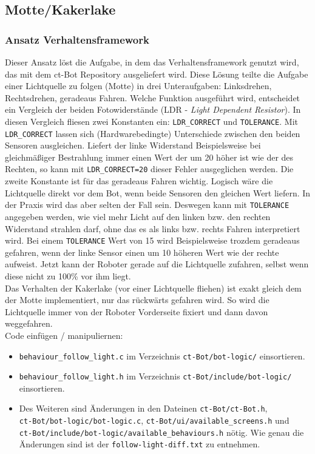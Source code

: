 \subsection{Motte/Kakerlake}
\label{motte_kakerlake}

\subsubsection{Ansatz Verhaltensframework}

Dieser Ansatz löst die Aufgabe, in dem das Verhaltensframework
genutzt wird, das mit dem ct-Bot Repository ausgeliefert wird.
Diese Lösung teilte die Aufgabe einer Lichtquelle zu folgen (Motte) in drei
Unteraufgaben: Linksdrehen, Rechtsdrehen, geradeaus Fahren.
Welche Funktion ausgeführt wird, entscheidet ein Vergleich der beiden Fotowiderstände
(LDR - \textit{Light Dependent Resistor}). In diesen Vergleich fliesen zwei Konstanten ein:
\verb+LDR_CORRECT+ und \verb+TOLERANCE+. Mit \verb+LDR_CORRECT+ lassen sich
(Hardwarebedingte) Unterschiede zwischen den beiden Sensoren ausgleichen. Liefert
der linke Widerstand Beispielsweise bei gleichmäßiger Bestrahlung immer einen
Wert der um 20 höher ist wie der des Rechten, so kann mit \verb+LDR_CORRECT=20+ dieser
Fehler ausgeglichen werden. Die zweite Konstante ist für das geradeaus Fahren wichtig.
Logisch wäre die Lichtquelle direkt vor dem Bot, wenn beide Sensoren den gleichen
Wert liefern. In der Praxis wird das aber selten der Fall sein. Deswegen kann mit
\verb+TOLERANCE+ angegeben werden, wie viel mehr Licht auf den linken bzw. den rechten
Widerstand strahlen darf, ohne das es als links bzw. rechts Fahren interpretiert wird.
Bei einem \verb+TOLERANCE+ Wert von 15 wird Beispielsweise trozdem geradeaus gefahren,
wenn der linke Sensor einen um 10 höheren Wert wie der rechte aufweist. Jetzt kann
der Roboter gerade auf die Lichtquelle zufahren, selbst wenn diese nicht zu 100\%
vor ihm liegt. \\

Das Verhalten der Kakerlake (vor einer Lichtquelle fliehen) ist exakt gleich dem der 
Motte implementiert, nur das rückwärts gefahren wird. So wird die Lichtquelle immer
von der Roboter Vorderseite fixiert und dann davon weggefahren. \\

Code einfügen / manipuliernen:
\begin{itemize}
    \item \verb+behaviour_follow_light.c+  im Verzeichnis 
        \verb+ct-Bot/bot-logic/+ einsortieren.
    \item \verb+behaviour_follow_light.h+ im Verzeichnis
        \verb+ct-Bot/include/bot-logic/+ einsortieren.
    \item Des Weiteren sind Änderungen in den Dateinen \verb+ct-Bot/ct-Bot.h+, \\
        \verb+ct-Bot/bot-logic/bot-logic.c+,
        \verb+ct-Bot/ui/available_screens.h+ und \\
        \verb+ct-Bot/include/bot-logic/available_behaviours.h+ nötig.
        Wie genau die Änderungen sind ist der \verb+follow-light-diff.txt+ zu entnehmen.
\end{itemize}

